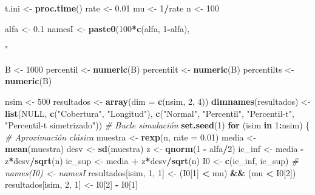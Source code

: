 \documentclass[]{book}
\newenvironment{Shaded}{\begin{snugshade}}{\end{snugshade}}
\newcommand{\KeywordTok}[1]{\textcolor[rgb]{0.13,0.29,0.53}{\textbf{#1}}}
\newcommand{\DataTypeTok}[1]{\textcolor[rgb]{0.13,0.29,0.53}{#1}}
\newcommand{\DecValTok}[1]{\textcolor[rgb]{0.00,0.00,0.81}{#1}}
\newcommand{\FloatTok}[1]{\textcolor[rgb]{0.00,0.00,0.81}{#1}}
\newcommand{\StringTok}[1]{\textcolor[rgb]{0.31,0.60,0.02}{#1}}
\newcommand{\CommentTok}[1]{\textcolor[rgb]{0.56,0.35,0.01}{\textit{#1}}}
\newcommand{\OtherTok}[1]{\textcolor[rgb]{0.56,0.35,0.01}{#1}}
\newcommand{\ControlFlowTok}[1]{\textcolor[rgb]{0.13,0.29,0.53}{\textbf{#1}}}
\newcommand{\OperatorTok}[1]{\textcolor[rgb]{0.81,0.36,0.00}{\textbf{#1}}}
\newcommand{\NormalTok}[1]{#1}
\theoremstyle{definition}
\theoremstyle{definition}
\theoremstyle{definition}
\theoremstyle{remark}
\begin{document}
\begin{Shaded}
\begin{Highlighting}[]
\NormalTok{t.ini <-}\StringTok{ }\KeywordTok{proc.time}\NormalTok{()}
\NormalTok{rate <-}\StringTok{ }\FloatTok{0.01}
\NormalTok{mu <-}\StringTok{ }\DecValTok{1}\OperatorTok{/}\NormalTok{rate}
\NormalTok{n <-}\StringTok{ }\DecValTok{100}

\NormalTok{alfa <-}\StringTok{ }\FloatTok{0.1}
\NormalTok{namesI <-}\StringTok{ }\KeywordTok{paste0}\NormalTok{(}\DecValTok{100}\OperatorTok{*}\KeywordTok{c}\NormalTok{(alfa, }\DecValTok{1}\OperatorTok{-}\NormalTok{alfa), }\StringTok{"%

\NormalTok{B <-}\StringTok{ }\DecValTok{1000}
\NormalTok{percentil <-}\StringTok{ }\KeywordTok{numeric}\NormalTok{(B)}
\NormalTok{percentilt <-}\StringTok{ }\KeywordTok{numeric}\NormalTok{(B)}
\NormalTok{percentilts <-}\StringTok{ }\KeywordTok{numeric}\NormalTok{(B)}

\NormalTok{nsim <-}\StringTok{ }\DecValTok{500}
\NormalTok{resultados <-}\StringTok{ }\KeywordTok{array}\NormalTok{(}\DataTypeTok{dim =} \KeywordTok{c}\NormalTok{(nsim, }\DecValTok{2}\NormalTok{, }\DecValTok{4}\NormalTok{))}
\KeywordTok{dimnames}\NormalTok{(resultados) <-}\StringTok{ }\KeywordTok{list}\NormalTok{(}\OtherTok{NULL}\NormalTok{, }\KeywordTok{c}\NormalTok{(}\StringTok{"Cobertura"}\NormalTok{, }\StringTok{"Longitud"}\NormalTok{),}
        \KeywordTok{c}\NormalTok{(}\StringTok{"Normal"}\NormalTok{, }\StringTok{"Percentil"}\NormalTok{, }\StringTok{"Percentil-t"}\NormalTok{, }\StringTok{"Percentil-t simetrizado"}\NormalTok{))}
\CommentTok{# Bucle simulación}
\KeywordTok{set.seed}\NormalTok{(}\DecValTok{1}\NormalTok{)}
\ControlFlowTok{for}\NormalTok{ (isim }\ControlFlowTok{in} \DecValTok{1}\OperatorTok{:}\NormalTok{nsim) \{}
    \CommentTok{# Aproximación clásica}
\NormalTok{    muestra <-}\StringTok{ }\KeywordTok{rexp}\NormalTok{(n, }\DataTypeTok{rate =} \FloatTok{0.01}\NormalTok{)}
\NormalTok{    media <-}\StringTok{ }\KeywordTok{mean}\NormalTok{(muestra)}
\NormalTok{    desv <-}\StringTok{ }\KeywordTok{sd}\NormalTok{(muestra)}
\NormalTok{    z <-}\StringTok{ }\KeywordTok{qnorm}\NormalTok{(}\DecValTok{1} \OperatorTok{-}\StringTok{ }\NormalTok{alfa}\OperatorTok{/}\DecValTok{2}\NormalTok{)}
\NormalTok{    ic_inf <-}\StringTok{ }\NormalTok{media }\OperatorTok{-}\StringTok{ }\NormalTok{z}\OperatorTok{*}\NormalTok{desv}\OperatorTok{/}\KeywordTok{sqrt}\NormalTok{(n)}
\NormalTok{    ic_sup <-}\StringTok{ }\NormalTok{media }\OperatorTok{+}\StringTok{ }\NormalTok{z}\OperatorTok{*}\NormalTok{desv}\OperatorTok{/}\KeywordTok{sqrt}\NormalTok{(n)}
\NormalTok{    I0 <-}\StringTok{ }\KeywordTok{c}\NormalTok{(ic_inf, ic_sup)}
    \CommentTok{# names(I0) <- namesI}
\NormalTok{    resultados[isim, }\DecValTok{1}\NormalTok{, }\DecValTok{1}\NormalTok{] <-}\StringTok{ }\NormalTok{(I0[}\DecValTok{1}\NormalTok{] }\OperatorTok{<}\StringTok{ }\NormalTok{mu) }\OperatorTok{&&}\StringTok{ }\NormalTok{(mu }\OperatorTok{<}\StringTok{ }\NormalTok{I0[}\DecValTok{2}\NormalTok{])}
\NormalTok{    resultados[isim, }\DecValTok{2}\NormalTok{, }\DecValTok{1}\NormalTok{] <-}\StringTok{ }\NormalTok{I0[}\DecValTok{2}\NormalTok{] }\OperatorTok{-}\StringTok{ }\NormalTok{I0[}\DecValTok{1}\NormalTok{]}
    
}
\end{Highlighting}
\end{Shaded}
\end{document}
